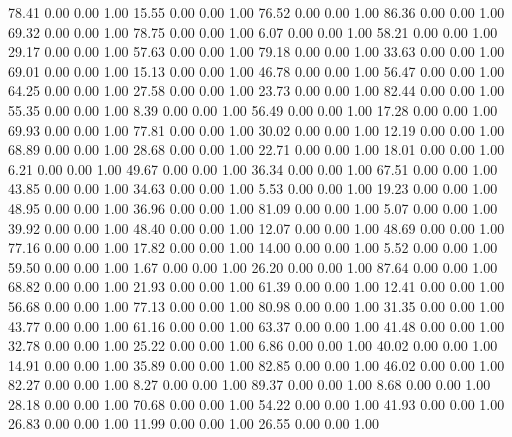    78.41   0.00   0.00   1.00
   15.55   0.00   0.00   1.00
   76.52   0.00   0.00   1.00
   86.36   0.00   0.00   1.00
   69.32   0.00   0.00   1.00
   78.75   0.00   0.00   1.00
    6.07   0.00   0.00   1.00
   58.21   0.00   0.00   1.00
   29.17   0.00   0.00   1.00
   57.63   0.00   0.00   1.00
   79.18   0.00   0.00   1.00
   33.63   0.00   0.00   1.00
   69.01   0.00   0.00   1.00
   15.13   0.00   0.00   1.00
   46.78   0.00   0.00   1.00
   56.47   0.00   0.00   1.00
   64.25   0.00   0.00   1.00
   27.58   0.00   0.00   1.00
   23.73   0.00   0.00   1.00
   82.44   0.00   0.00   1.00
   55.35   0.00   0.00   1.00
    8.39   0.00   0.00   1.00
   56.49   0.00   0.00   1.00
   17.28   0.00   0.00   1.00
   69.93   0.00   0.00   1.00
   77.81   0.00   0.00   1.00
   30.02   0.00   0.00   1.00
   12.19   0.00   0.00   1.00
   68.89   0.00   0.00   1.00
   28.68   0.00   0.00   1.00
   22.71   0.00   0.00   1.00
   18.01   0.00   0.00   1.00
    6.21   0.00   0.00   1.00
   49.67   0.00   0.00   1.00
   36.34   0.00   0.00   1.00
   67.51   0.00   0.00   1.00
   43.85   0.00   0.00   1.00
   34.63   0.00   0.00   1.00
    5.53   0.00   0.00   1.00
   19.23   0.00   0.00   1.00
   48.95   0.00   0.00   1.00
   36.96   0.00   0.00   1.00
   81.09   0.00   0.00   1.00
    5.07   0.00   0.00   1.00
   39.92   0.00   0.00   1.00
   48.40   0.00   0.00   1.00
   12.07   0.00   0.00   1.00
   48.69   0.00   0.00   1.00
   77.16   0.00   0.00   1.00
   17.82   0.00   0.00   1.00
   14.00   0.00   0.00   1.00
    5.52   0.00   0.00   1.00
   59.50   0.00   0.00   1.00
    1.67   0.00   0.00   1.00
   26.20   0.00   0.00   1.00
   87.64   0.00   0.00   1.00
   68.82   0.00   0.00   1.00
   21.93   0.00   0.00   1.00
   61.39   0.00   0.00   1.00
   12.41   0.00   0.00   1.00
   56.68   0.00   0.00   1.00
   77.13   0.00   0.00   1.00
   80.98   0.00   0.00   1.00
   31.35   0.00   0.00   1.00
   43.77   0.00   0.00   1.00
   61.16   0.00   0.00   1.00
   63.37   0.00   0.00   1.00
   41.48   0.00   0.00   1.00
   32.78   0.00   0.00   1.00
   25.22   0.00   0.00   1.00
    6.86   0.00   0.00   1.00
   40.02   0.00   0.00   1.00
   14.91   0.00   0.00   1.00
   35.89   0.00   0.00   1.00
   82.85   0.00   0.00   1.00
   46.02   0.00   0.00   1.00
   82.27   0.00   0.00   1.00
    8.27   0.00   0.00   1.00
   89.37   0.00   0.00   1.00
    8.68   0.00   0.00   1.00
   28.18   0.00   0.00   1.00
   70.68   0.00   0.00   1.00
   54.22   0.00   0.00   1.00
   41.93   0.00   0.00   1.00
   26.83   0.00   0.00   1.00
   11.99   0.00   0.00   1.00
   26.55   0.00   0.00   1.00
